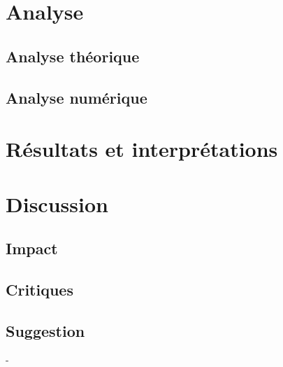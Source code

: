 \documentclass[fleqn,10pt]{SelfArx}
\begin{document}
\section*{Analyse}
\subsection*{Analyse théorique}
\subsection*{Analyse numérique}

\section*{Résultats et interprétations }

\section*{Discussion}
\subsection*{Impact}
\subsection*{Critiques}
\subsection*{Suggestion}






-
\end{document}
